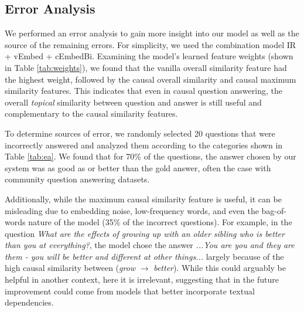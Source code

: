 \subsection{Error Analysis}
\label{sec-emnlp2016:erroranalysis}

We performed an error analysis to gain more insight into our model as well as the source of the remaining errors.  For simplicity, we used the combination model IR + vEmbed + cEmbedBi. Examining the model's learned feature weights (shown in Table \ref{tab:weights}), we found that the vanilla overall similarity feature had the highest weight, followed by the causal overall similarity and causal maximum similarity features.  This indicates that even in causal question answering, the overall \emph{topical} similarity between question and answer is still useful and complementary to the causal similarity features.

To determine sources of error, we randomly selected 20 questions that were incorrectly answered and analyzed them according to the categories shown in Table \ref{tab:ea}.  We found that for 70\% of the questions, the answer chosen by our system was as good as or better than the gold answer, often the case with community question answering datasets.

Additionally, while the maximum causal similarity feature is useful, it can be misleading due to embedding noise, low-frequency words, and even the bag-of-words nature of the model (35\% of the incorrect questions).  For example, in the question \emph{What are the effects of growing up with an older sibling who is better than you at everything?}, the model chose the answer \emph{...You are you and they are them - you will be better and different at other things...}  largely because of the high causal similarity between (\emph{grow} $\rightarrow$ \emph{better}).  While this could arguably be helpful in another context, here it is irrelevant, suggesting that in the future improvement could come from models that better incorporate textual dependencies.

